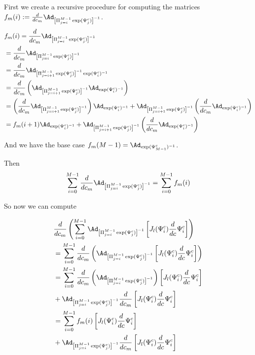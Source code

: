 \documentclass[12pt]{article}
\begin{document}
First we create a recursive procedure for computing the matrices $f_m(i) := \frac{d}{dc_m}\Ad_{\left[\Pi_{j=i}^{M-1} \exp(\Psi^c_j)\right]^{-1}}$.
\[
  \begin{aligned}
    &f_m(i) = \frac{d}{dc_m}\Ad_{\left[\Pi_{j=i}^{M-1} \exp(\Psi^c_j)\right]^{-1}} \\
    &= \frac{d}{dc_m}\Ad_{\left[\Pi_{j=i}^{M-1} \exp(\Psi^c_j)\right]^{-1}} \\
    &= \frac{d}{dc_m}\Ad_{\left  [\Pi_{j=i+1}^{M-1} \exp(\Psi^c_j)\right]^{-1} \exp(\Psi^c_{i})^{-1}} \\
    &= \frac{d}{dc_m}\left(\Ad_{\left  [\Pi_{j=i+1}^{M-1} \exp(\Psi^c_j)\right]^{-1}}\Ad_{ \exp(\Psi^c_{i})^{-1}} \right)\\
    &= \left(\frac{d}{dc_m}\Ad_{\left  [\Pi_{j=i+1}^{M-1} \exp(\Psi^c_j)\right]^{-1}}\right)\Ad_{ \exp(\Psi^c_{i})^{-1}} + \Ad_{\left  [\Pi_{j=i+1}^{M-1} \exp(\Psi^c_j)\right]^{-1}}\left(\frac{d}{dc_m}\Ad_{ \exp(\Psi^c_{i})^{-1}}\right) \\
    &= f_m(i+1) \Ad_{ \exp(\Psi^c_{i})^{-1}} + \Ad_{\left  [\Pi_{j=i+1}^{M-1} \exp(\Psi^c_j)\right]^{-1}} \left(\frac{d}{dc_m}\Ad_{ \exp(\Psi^c_{i})^{-1}}\right) 
  \end{aligned}
\]

And we have the base case $f_m(M-1) = \Ad_{ \exp(\Psi^c_{M-1})^{-1}}$.

Then
\[
  \begin{aligned}
    \sum_{i=0}^{M-1} \frac{d}{dc_m}\Ad_{\left[\Pi_{j=i}^{M-1} \exp(\Psi^c_j)\right]^{-1}} = \sum_{i=0}^{M-1} f_m(i)\\
  \end{aligned}
\]

So now we can compute

\[
  \begin{aligned}
    &\frac{d}{dc_m}\left(\sum_{i=0}^{M-1}\Ad_{\left[\Pi_{j=i}^{M-1} \exp(\Psi^c_j)\right]^{-1}}\left[J_l(\Psi^c_i)\frac{d}{dc}\Psi^c_i \right]\right) \\
    &= \sum_{i=0}^{M-1}\frac{d}{dc_m}\left(\Ad_{\left[\Pi_{j=i}^{M-1} \exp(\Psi^c_j)\right]^{-1}}\left[J_l(\Psi^c_i)\frac{d}{dc}\Psi^c_i \right]\right) \\
    &= \sum_{i=0}^{M-1}\frac{d}{dc_m}\left(\Ad_{\left[\Pi_{j=i}^{M-1} \exp(\Psi^c_j)\right]^{-1}}\right)\left[J_l(\Psi^c_i)\frac{d}{dc}\Psi^c_i \right] \\
    &+  \Ad_{\left[\Pi_{j=i}^{M-1} \exp(\Psi^c_j)\right]^{-1}}\frac{d}{dc_m}\left[J_l(\Psi^c_i)\frac{d}{dc}\Psi^c_i \right]\\
    &= \sum_{i=0}^{M-1}f_m(i)\left[J_l(\Psi^c_i)\frac{d}{dc}\Psi^c_i \right] \\
    &+  \Ad_{\left[\Pi_{j=i}^{M-1} \exp(\Psi^c_j)\right]^{-1}}\frac{d}{dc_m}\left[J_l(\Psi^c_i)\frac{d}{dc}\Psi^c_i \right]\\
  \end{aligned}
\]
\end{document}
